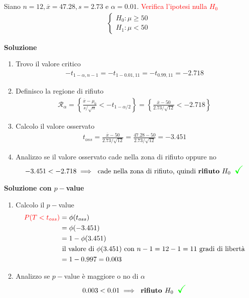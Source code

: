 \documentclass{article}  %
\theoremstyle{definition}
\begin{document}
\begin{esercizio}
	Siano $n=12, \overline{x}=47.28, s=2.73$ e $\alpha=0.01$. \textcolor{red}{Verifica l'ipotesi nulla $H_0$}
	\begin{align*}
		\begin{cases}
			H_0: \mu \geq 50 \\
			H_1: \mu < 50
		\end{cases}
	\end{align*}
	\begin{center}
		\textbf{Soluzione}
	\end{center}
	\begin{enumerate}
		\item Trovo il valore critico
		\begin{align*}
			-t_{1-\alpha, n-1} = -t_{1-0.01, 11} = -t_{0.99, 11} = -2.718
		\end{align*}
		\item Definisco la regione di rifiuto 
		\begin{align*}
			\mathcal{R}_{\alpha}=\left\{\frac{\overline{x}-\mu_0}{s/\sqrt{n}}< -t_{1-\alpha/2} \right\}=
			\left\{\frac{\overline{x}-50}{2.73/\sqrt{12}}< -2.718 \right\}
		\end{align*}
		\item Calcolo il valore osservato
		\begin{align*}
			t_{oss} = \frac{\overline{x}-50}{2.73/\sqrt{12}} = \frac{47.28-50}{2.73/\sqrt{12}} = -3.451
		\end{align*}
		\item Analizzo se il valore osservato cade nella zona di rifiuto oppure no
		\begin{align*}
			-3.451 < -2.718 \implies \text{ cade nella zona di rifiuto, quindi \textbf{rifiuto} } H_0 \textcolor{green}{\scalebox{1.6}{ \checkmark}}
		\end{align*}
	\end{enumerate}
	\begin{center}
		\textbf{Soluzione con $p-$value}
	\end{center}
	\begin{enumerate}
		\item Calcolo il $p-$value
		\begin{align*}
			\textcolor{red}{P(T < t_{oss})} &= \phi(t_{oss}) \\
			&= \phi(-3.451) \\
			&= 1 - \phi(3.451) \\
			& \text{ il valore di }  \phi(3.451) \text{ con } n-1=12-1=11 \text{ gradi di libertà} \\
			&= 1 - 0.997 = 0.003
		\end{align*}
		\item Analizzo se $p-$value è maggiore o no di $\alpha$
		\begin{align*}
			0.003 < 0.01 \implies \text{ \textbf{rifiuto $H_0$}} \textcolor{green}{\scalebox{1.6}{ \checkmark}}
		\end{align*}
	\end{enumerate}
\end{esercizio}
\end{document}
